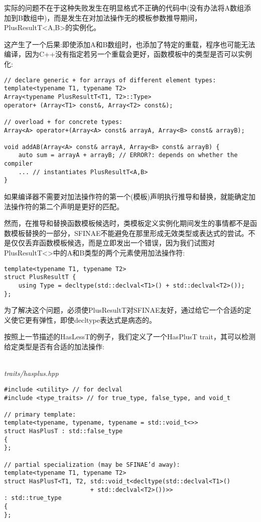 实际的问题不在于这种失败发生在明显格式不正确的代码中(没有办法将A数组添加到B数组中)，而是发生在对加法操作无的模板参数推导期间，PlusResultT<A,B>的实例化。

这产生了一个后果:即使添加A和B数组时，也添加了特定的重载，程序也可能无法编译，因为C++没有指定若另一个重载会更好，函数模板中的类型是否可以实例化:

\begin{lstlisting}[style=styleCXX]
// declare generic + for arrays of different element types:
template<typename T1, typename T2>
Array<typename PlusResultT<T1, T2>::Type>
operator+ (Array<T1> const&, Array<T2> const&);

// overload + for concrete types:
Array<A> operator+(Array<A> const& arrayA, Array<B> const& arrayB);

void addAB(Array<A> const& arrayA, Array<B> const& arrayB) {
	auto sum = arrayA + arrayB; // ERROR?: depends on whether the compiler
	... // instantiates PlusResultT<A,B>
}
\end{lstlisting}

如果编译器不需要对加法操作符的第一个(模板)声明执行推导和替换，就能确定加法操作符的第二个声明是更好的匹配。

然而，在推导和替换函数模板候选时，类模板定义实例化期间发生的事情都不是函数模板替换的一部分，SFINAE不能避免在那里形成无效类型或表达式的尝试。不是仅仅丢弃函数模板候选，而是立即发出一个错误，因为我们试图对PlusResultT<>中的A和B类型的两个元素使用加法操作符:

\begin{lstlisting}[style=styleCXX]
template<typename T1, typename T2>
struct PlusResultT {
	using Type = decltype(std::declval<T1>() + std::declval<T2>());
};
\end{lstlisting}

为了解决这个问题，必须使PlusResultT对SFINAE友好，通过给它一个合适的定义使它更有弹性，即使decltype表达式是病态的。

按照上一节描述的HasLessT的例子，我们定义了一个HasPlusT trait，其可以检测给定类型是否有合适的加法操作:

\hspace*{\fill} \\ %
\noindent
\textit{traits/hasplus.hpp}
\begin{lstlisting}[style=styleCXX]
#include <utility> // for declval
#include <type_traits> // for true_type, false_type, and void_t

// primary template:
template<typename, typename, typename = std::void_t<>>
struct HasPlusT : std::false_type
{
};

// partial specialization (may be SFINAE’d away):
template<typename T1, typename T2>
struct HasPlusT<T1, T2, std::void_t<decltype(std::declval<T1>()
						+ std::declval<T2>())>>
: std::true_type
{
};
\end{lstlisting}

